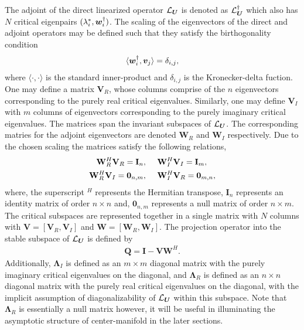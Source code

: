 The adjoint of the direct linearized operator $\mathcal{L}_{\boldsymbol{U}}$ is denoted as $\mathcal{L}_{\boldsymbol{U}}^{\dagger}$ which also has $N$ critical eigenpairs $(\lambda^{*}_{i}, \boldsymbol{w}^{\dagger}_{i})$. The scaling of the eigenvectors of the direct and adjoint operators may be defined such that they satisfy the birthogonality condition
\begin{eqnarray}
	\langle\boldsymbol{w}^{\dagger}_{i},\boldsymbol{v}_{j}\rangle = \delta_{i,j} \label{eqn:std_biorthogonality},
\end{eqnarray}
where $\langle\cdot,\cdot\rangle$ is the standard inner-product and $\delta_{i,j}$ is the Kronecker-delta fuction. One may define a matrix $\mathbf{V}_{R}$, whose columns comprise of the $n$ eigenvectors corresponding to the purely real critical eigenvalues. Similarly, one may define $\mathbf{V}_{I}$ with $m$ columns of eigenvectors corresponding to the purely imaginary critical eigenvalues. The matrices span the invariant subspaces of $\mathcal{L}_{\boldsymbol{U}}$. The corresponding matries for the adjoint eigenvectors are denoted $\mathbf{W}_{R}$ and $\mathbf{W}_{I}$ respectively. Due to the chosen scaling the matrices satisfy the following relations,
\begin{subequations}
	\begin{align}
		\mathbf{W}_{R}^{H}\mathbf{V}_{R} = \mathbf{I}_{n}, \hspace{5mm} & \mathbf{W}_{I}^{H}\mathbf{V}_{I} = \mathbf{I}_{m},	\\
		\mathbf{W}_{R}^{H}\mathbf{V}_{I} = \mathbf{0}_{n,m}, \hspace{5mm} & \mathbf{W}_{I}^{H}\mathbf{V}_{R} = \mathbf{0}_{m,n},
	\end{align}
	\label{eqn:biorthogonal_matrices}
\end{subequations}
where, the superscript $^{H}$ represents the Hermitian transpose, $\mathbf{I}_{n}$ represents an identity matrix of order $n\times n$ and, $\mathbf{0}_{n,m}$ represents a null matrix of order $n\times m$. The critical subspaces are represented together in a single matrix with $N$ columns with $\mathbf{V} = [\mathbf{V}_{R}, \mathbf{V}_{I}]$ and $\mathbf{W} = [\mathbf{W}_{R}, \mathbf{W}_{I}]$. The projection operator  into the stable subspace of $\mathcal{L}_{\boldsymbol{U}}$ is defined by
\begin{eqnarray}
	\label{eqn:stable_projector}
	\mathbf{Q} = \mathbf{I} - \mathbf{V}\mathbf{W}^{H}.
\end{eqnarray}
Additionally, $\mathbf{\Lambda}_{I}$ is defined as an $m\times m$ diagonal matrix with the purely imaginary critical eigenvalues on the diagonal, and $\mathbf{\Lambda}_{R}$ is defined as an $n\times n$ diagonal matrix with the purely real critical eigenvalues on the diagonal, with the implicit assumption of diagonalizability of $\mathcal{L}_{\boldsymbol{U}}$ within this subspace. Note that $\mathbf{\Lambda}_{R}$ is essentially a null matrix however, it will be useful in illuminating the asymptotic structure of center-manifold in the later sections. 


